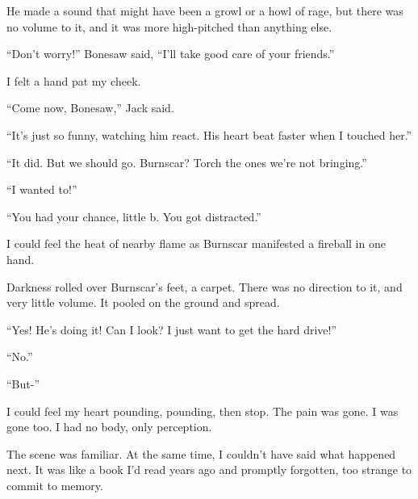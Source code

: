 He made a sound that might have been a growl or a howl of rage, but there was no volume to it, and it was more high-pitched than anything else.



``Don't worry!''  Bonesaw said, ``I'll take good care of your friends.''



I felt a hand pat my cheek.



``Come now, Bonesaw,'' Jack said.



``It's just so funny, watching him react.  His heart beat faster when I touched her.''



``It did.  But we should go.  Burnscar?  Torch the ones we're not bringing.''



``I wanted to!''



``You had your chance, little b.  You got distracted.''



I could feel the heat of nearby flame as Burnscar manifested a fireball in one hand.



Darkness rolled over Burnscar's feet, a carpet.  There was no direction to it, and very little volume.  It pooled on the ground and spread.



``Yes!  He's doing it!  Can I look?  I just want to get the hard drive!''



``No.''



``But-''



I could feel my heart pounding, pounding, then stop.  The pain was gone.  I was gone too.  I had no body, only perception.



The scene was familiar.  At the same time, I couldn't have said what happened next.  It was like a book I'd read years ago and promptly forgotten, too strange to commit to memory.



